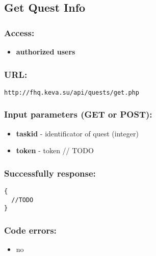 \subsection{Get Quest Info}
\par

\subsubsection{Access:}
\begin{itemize}
  \item \textbf{authorized users}
\end{itemize}

\subsubsection{URL:}
\begin{Verbatim}[frame=single]
http://fhq.keva.su/api/quests/get.php
\end{Verbatim}

\subsubsection{Input parameters (GET or POST):}
\begin{itemize}
  \item \textbf{taskid} - identificator of quest (integer)
  \item \textbf{token} - token // TODO
\end{itemize}

\subsubsection{Successfully response:}
\begin{Verbatim}[frame=single]
{
  //TODO
}
\end{Verbatim}

\subsubsection{Code errors:}
\begin{itemize}
	\item no
\end{itemize}

